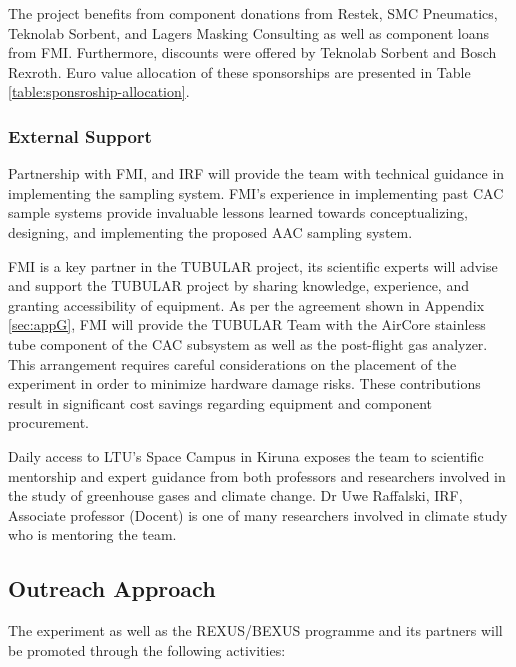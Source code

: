 \documentclass[a4paper,12pt,twoside]{article}
\begin{document}
The project benefits from component donations from Restek, SMC Pneumatics, Teknolab Sorbent, and Lagers Masking Consulting as well as component loans from FMI. Furthermore, discounts were offered by Teknolab Sorbent and Bosch Rexroth. Euro value allocation of these sponsorships are presented in Table \ref{table:sponsroship-allocation}.



\subsubsection{External Support}

Partnership with FMI, and IRF will provide the team with technical guidance in implementing the sampling system. FMI’s experience in implementing past CAC sample systems provide invaluable lessons learned towards conceptualizing, designing, and implementing the proposed AAC sampling system.

FMI is a key partner in the TUBULAR project, its scientific experts will advise and support the TUBULAR project by sharing knowledge, experience, and granting accessibility of equipment. As per the agreement shown in Appendix \ref{sec:appG}, FMI will provide the TUBULAR Team with the AirCore stainless tube component of the CAC subsystem as well as the post-flight gas analyzer. This arrangement requires careful considerations on the placement of the experiment in order to minimize hardware damage risks. These contributions result in significant cost savings regarding equipment and component procurement.

Daily access to LTU's Space Campus in Kiruna exposes the team to scientific mentorship and expert guidance from both professors and researchers involved in the study of greenhouse gases and climate change. Dr Uwe Raffalski, IRF, Associate professor (Docent) is one of many researchers involved in climate study who is mentoring the team.
\pagebreak

\subsection{Outreach Approach}

The experiment as well as the REXUS/BEXUS programme and its partners will be promoted through the following activities:
\end{document}
